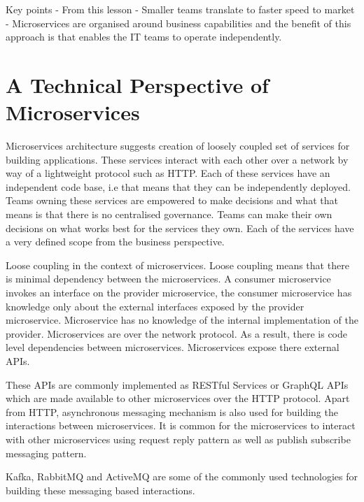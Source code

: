 \documentclass[a4paper, 11pt]{book}
\begin{document}
    Key points
    - From this lesson
    - Smaller teams translate to faster speed to market
    - Microservices are organised around business capabilities and the benefit of this approach is that enables the IT teams to operate independently.


    \section{A Technical Perspective of Microservices}

    Microservices architecture suggests creation of loosely coupled set of services for building applications.
    These services interact with each other over a network by way of a lightweight protocol such as HTTP\@.
    Each of these services have an independent code base, i.e that means that they can be independently deployed.
    Teams owning these services are empowered to make decisions and what that means is that there is no centralised governance.
    Teams can make their own decisions on what works best for the services they own.
    Each of the services have a very defined scope from the business perspective.

    Loose coupling in the context of microservices.
    Loose coupling means that there is minimal dependency between the microservices.
    A consumer microservice invokes an interface on the provider microservice, the consumer microservice has knowledge only about the external interfaces exposed by the provider microservice.
    Microservice has no knowledge of the internal implementation of the provider.
    Microservices are over the network protocol.
    As a result, there is code level dependencies between microservices.
    Microservices expose there external APIs.

    These APIs are commonly implemented as RESTful Services or GraphQL APIs which are made available to other microservices over the HTTP protocol.
    Apart from HTTP, asynchronous messaging mechanism is also used for building the interactions between microservices.
    It is common for the microservices to interact with other microservices using request reply pattern as well as publish subscribe messaging pattern.

    Kafka, RabbitMQ and ActiveMQ are some of the commonly used technologies for building these messaging based interactions.
\end{document}
